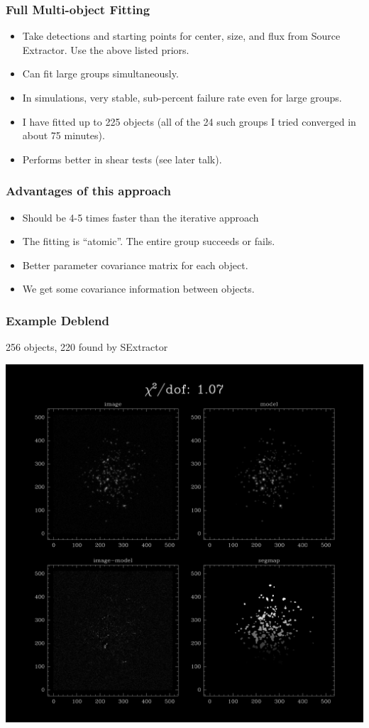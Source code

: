 \documentclass{beamer}
\begin{document}
\frame
{
    \frametitle{Full Multi-object Fitting}

    \begin{itemize}

        \item Take detections and starting points for
            center, size, and flux from Source Extractor.  Use the
            above listed priors.
            
        \item Can fit large groups simultaneously.

        \item In simulations, very stable, sub-percent failure rate
            even for large groups.

        \item I have fitted up to 225 objects (all of the 24 such groups I tried converged
            in about 75 minutes).

        \item Performs better in shear tests (see later talk).

    \end{itemize}

}
\frame
{
    \frametitle{Advantages of this approach}

    \begin{itemize}

        \item Should be 4-5 times faster than the iterative approach

        \item The fitting is ``atomic''.  The entire group succeeds or fails.

        \item Better parameter covariance matrix for each object.

        \item We get some covariance information between objects.

    \end{itemize}
}

\frame
{
    \frametitle{Example Deblend}

        256 objects, 220 found by SExtractor
    \begin{center}
        \includegraphics[width=0.7\columnwidth]{diff-20855-000000.png}
    \end{center}
}
\end{document}

